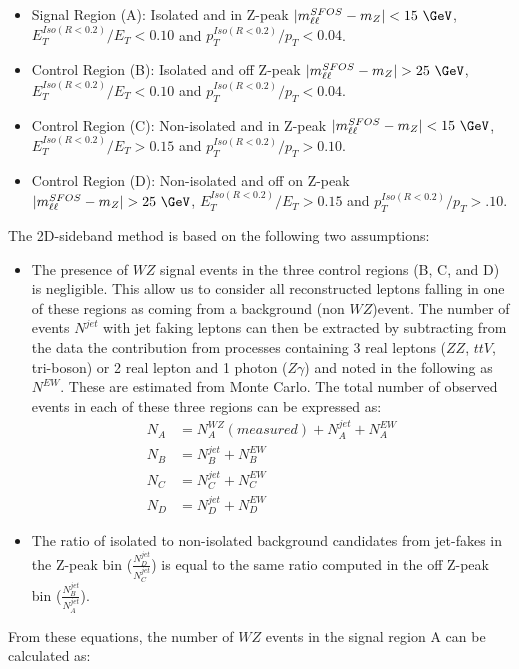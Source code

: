 \begin{itemize}
	\item Signal Region (A): Isolated and in Z-peak $|m_{\ell\ell}^{SFOS}-m_{Z}|<15~\GeV$, $E_{T}^{Iso(R<0.2)}/E_{T}<0.10$ and $p_{T}^{Iso(R<0.2)}/p_{T}<0.04$.
	\item Control Region (B): Isolated and off Z-peak $|m_{\ell\ell}^{SFOS}-m_{Z}|>25~\GeV$, $E_{T}^{Iso(R<0.2)}/E_{T}<0.10$ and $p_{T}^{Iso(R<0.2)}/p_{T}<0.04$.
	\item Control Region (C): Non-isolated and in Z-peak $|m_{\ell\ell}^{SFOS}-m_{Z}|<15~\GeV$, $E_{T}^{Iso(R<0.2)}/E_{T}>0.15$ and $p_{T}^{Iso(R<0.2)}/p_{T}>0.10$.
	\item Control Region (D): Non-isolated and off on Z-peak $|m_{\ell\ell}^{SFOS}-m_{Z}|>25~\GeV$, $E_{T}^{Iso(R<0.2)}/E_{T}>0.15$ and $p_{T}^{Iso(R<0.2)}/p_{T}>.10$.
	
\end{itemize}


The 2D-sideband method is based on the following two assumptions:
\begin{itemize}
\item The presence of $WZ$ signal events in the three control regions (B,
  C, and D) is negligible. This allow us to consider all
  reconstructed leptons falling in one of these regions as coming from a
  background (non $WZ$)event. The number of events $N^{jet}$ with jet faking leptons can then
  be extracted by subtracting from the data the contribution from processes containing 
  3 real leptons ($ZZ$, $ttV$, tri-boson) or 2 real lepton and 1 photon ($Z\gamma$)
  and noted in the following as $N^{EW}$. These are estimated from Monte Carlo. The total number of
  observed events in each of these three regions can be expressed as:
  \begin{align}
  N_A &= N_A^{WZ}(measured)+N_A^{jet}+N_A^{EW} \\
  N_B &= N_B^{jet}+N_B^{EW} \\
  N_C &= N_C^{jet}+N_C^{EW} \\
  N_D &= N_D^{jet}+N_D^{EW} 
  \end{align}

\item The ratio of isolated to non-isolated background candidates from
  jet-fakes in the Z-peak bin ($\frac{N_D^{jet}}{N_C^{jet}}$)
  is equal to the same ratio computed in the off Z-peak bin ($\frac{N_B^{jet}}{N_A^{jet}}$).
\end{itemize}

From these equations, the number of $WZ$ events in the signal region A can be calculated as:

